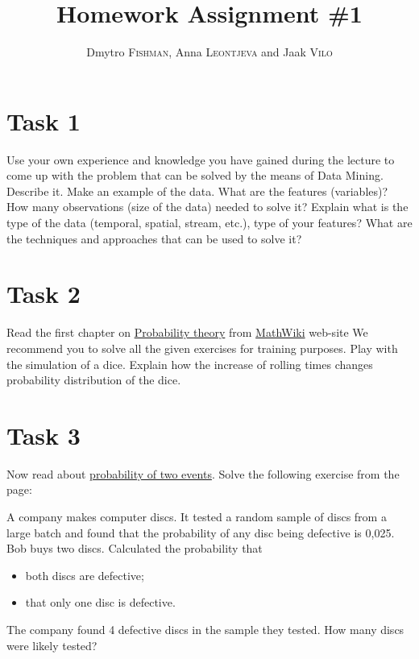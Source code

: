\documentclass{article}
\title{Homework Assignment \#1} %
\author{Dmytro \textsc{Fishman}, Anna \textsc{Leontjeva} and Jaak \textsc{Vilo}} %
\begin{document}
\maketitle %
\section*{Task 1}
Use your own experience and knowledge you have gained during the lecture to come up with the problem that can be solved by the means of Data Mining. Describe it. Make an example of the data. What are the features (variables)? How many observations (size of the data) needed to solve it? Explain what is the type of the data (temporal, spatial, stream, etc.), type of your features? What are the techniques and approaches that can be used to solve it?  

\section*{Task 2}
Read the first chapter on \href{http://mathwiki.cs.ut.ee/probability_theory}{Probability theory} from \href{http://mathwiki.cs.ut.ee/start}{MathWiki} web-site  We recommend you to solve all the given exercises for training purposes. Play with the simulation of a dice. Explain how the increase of rolling times changes probability distribution of the dice.

\section*{Task 3}
Now read about \href{http://mathwiki.cs.ut.ee/probability/02_multiple_event_probability}{probability of two events}. Solve the following exercise from the page:
\begin{framed}
A company makes computer discs. It tested a random sample of discs from a large batch and found that the probability of any disc being defective is 0,025.
\\
Bob buys two discs. Calculated the probability that
\begin{itemize}
\item both discs are defective;
\item that only one disc is defective.
\end{itemize}

The company found 4 defective discs in the sample they tested. How many discs were likely tested?
\end{framed}
\end{document}
